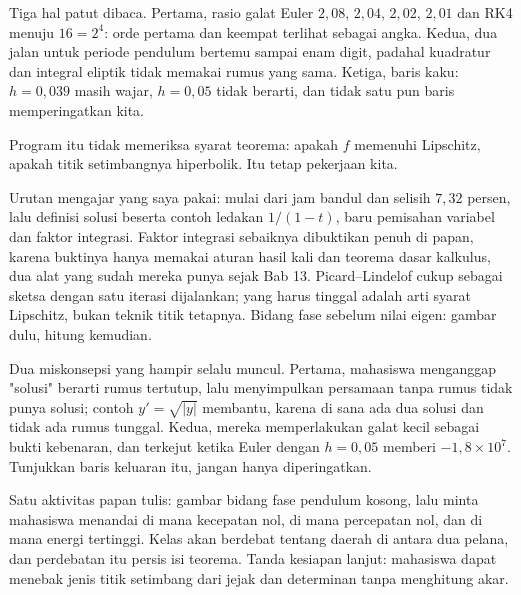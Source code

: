 Tiga hal patut dibaca. Pertama, rasio galat Euler $2{,}08$, $2{,}04$, $2{,}02$, $2{,}01$
dan RK4 menuju $16=2^{4}$: orde pertama dan keempat terlihat sebagai angka. Kedua,
dua jalan untuk periode pendulum bertemu sampai enam digit, padahal kuadratur dan
integral eliptik tidak memakai rumus yang sama. Ketiga, baris kaku: $h=0{,}039$
masih wajar, $h=0{,}05$ tidak berarti, dan tidak satu pun baris memperingatkan
kita.

Program itu tidak memeriksa syarat teorema: apakah $f$ memenuhi Lipschitz,
apakah titik setimbangnya hiperbolik. Itu tetap pekerjaan kita.

\begin{untukdosen}
Urutan mengajar yang saya pakai: mulai dari jam bandul dan selisih $7{,}32$
persen, lalu definisi solusi beserta contoh ledakan $1/(1-t)$, baru pemisahan
variabel dan faktor integrasi. Faktor integrasi sebaiknya dibuktikan penuh di
papan, karena buktinya hanya memakai aturan hasil kali dan teorema dasar
kalkulus, dua alat yang sudah mereka punya sejak Bab 13. Picard--Lindelof cukup
sebagai sketsa dengan satu iterasi dijalankan; yang harus tinggal adalah arti
syarat Lipschitz, bukan teknik titik tetapnya. Bidang fase sebelum nilai eigen:
gambar dulu, hitung kemudian.

Dua miskonsepsi yang hampir selalu muncul. Pertama, mahasiswa menganggap
"solusi" berarti rumus tertutup, lalu menyimpulkan persamaan tanpa rumus tidak
punya solusi; contoh $y'=\sqrt{|y|}$ membantu, karena di sana ada dua solusi dan
tidak ada rumus tunggal. Kedua, mereka memperlakukan galat kecil sebagai bukti
kebenaran, dan terkejut ketika Euler dengan $h=0{,}05$ memberi $-1{,}8\times10^{7}$.
Tunjukkan baris keluaran itu, jangan hanya diperingatkan.

Satu aktivitas papan tulis: gambar bidang fase pendulum kosong, lalu minta
mahasiswa menandai di mana kecepatan nol, di mana percepatan nol, dan di mana
energi tertinggi. Kelas akan berdebat tentang daerah di antara dua pelana, dan
perdebatan itu persis isi teorema. Tanda kesiapan lanjut: mahasiswa dapat
menebak jenis titik setimbang dari jejak dan determinan tanpa menghitung akar.

\end{untukdosen}

